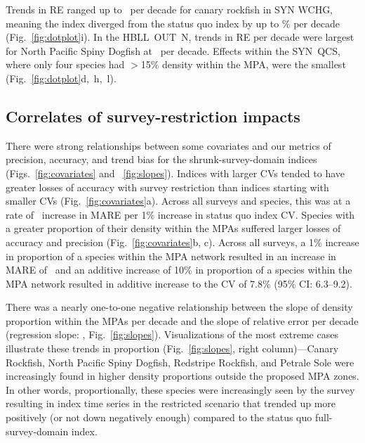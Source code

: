 \documentclass[12pt]{article}
\newcommand{\R}[1]{\label{#1}\linelabel{#1}}
\begin{document}
\begin{spacing}{1.4}
Trends in RE ranged up to \canaryrockfishSYNWCHGslopere\ per decade for canary rockfish in SYN WCHG, meaning the index diverged from the status quo index by up to \canaryrockfishSYNWCHGsloperePerc\% per decade (Fig.~\ref{fig:dotplot}i).
In the HBLL~OUT~N, trends in RE per decade were largest for North Pacific Spiny Dogfish at \northpacificspinydogfishSYNWCHGslopere\ per decade.
Effects within the SYN~QCS, where only four species had $>$15\% density within the MPA, were the smallest (Fig.~\ref{fig:dotplot}d,~h,~l).

\subsection*{Correlates of survey-restriction impacts}

There were strong relationships between some covariates and our metrics of precision, accuracy, and trend bias for the shrunk-survey-domain indices (Figs.~\ref{fig:covariates} and ~\ref{fig:slopes}).
Indices with larger CVs tended to have greater losses of accuracy with survey restriction than indices starting with smaller CVs (Fig.~\ref{fig:covariates}a).
Across all surveys and species, this was at a rate of \covCvmaregeostat\ increase in MARE per 1\% increase in status quo index CV.
Species with a greater proportion of their density within the MPAs suffered larger losses of accuracy and precision (Fig.~\ref{fig:covariates}b, c).
Across all surveys, a 1\% increase in proportion of a species within the MPA network resulted in an increase in MARE of \covMareGeo\ and
\R{B9b} an additive increase of 10\% in proportion of a species within the MPA network resulted in additive increase to the CV of 7.8\% (95\% CI: 6.3--9.2).

There was a nearly one-to-one negative relationship between the slope of density proportion within the MPAs per decade and the slope of relative error per decade (regression slope: \REslopeRegress, Fig.~\ref{fig:slopes}).
Visualizations of the most extreme cases illustrate these trends in proportion (Fig.~\ref{fig:slopes}, right column)---Canary Rockfish, North Pacific Spiny Dogfish, Redstripe Rockfish, and Petrale Sole were increasingly found in higher density proportions outside the proposed MPA zones.
In other words, proportionally, these species were increasingly seen by the survey resulting in index time series in the restricted scenario that trended up more positively (or not down negatively enough) compared to the status quo full-survey-domain index.


\end{spacing}
\end{document}
